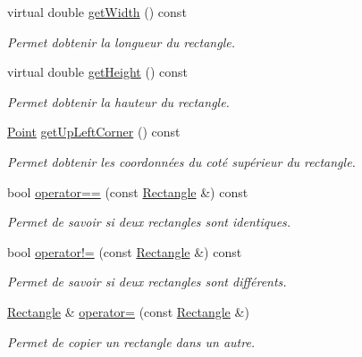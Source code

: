 \begin{DoxyCompactItemize}
virtual double \hyperlink{classRectangle_a1b97d538cc1acefa6b09aae2160e7921}{get\+Width} () const 
\begin{DoxyCompactList}\small\item\em Permet d\textquotesingle{}obtenir la longueur du rectangle. \end{DoxyCompactList}\item 
virtual double \hyperlink{classRectangle_aaad99f5dd2be859eef0eb3482cb55c13}{get\+Height} () const 
\begin{DoxyCompactList}\small\item\em Permet d\textquotesingle{}obtenir la hauteur du rectangle. \end{DoxyCompactList}\item 
\hyperlink{classPoint}{Point} \hyperlink{classRectangle_af54d3160a6d8d6c432b547207d997052}{get\+Up\+Left\+Corner} () const 
\begin{DoxyCompactList}\small\item\em Permet d\textquotesingle{}obtenir les coordonnées du coté supérieur du rectangle. \end{DoxyCompactList}\item 
bool \hyperlink{classRectangle_a140aa8d43ff12d36f3891dea9f439638}{operator==} (const \hyperlink{classRectangle}{Rectangle} \&) const 
\begin{DoxyCompactList}\small\item\em Permet de savoir si deux rectangles sont identiques. \end{DoxyCompactList}\item 
bool \hyperlink{classRectangle_ac29d68cce7f438771cf2b0e72888457a}{operator!=} (const \hyperlink{classRectangle}{Rectangle} \&) const 
\begin{DoxyCompactList}\small\item\em Permet de savoir si deux rectangles sont différents. \end{DoxyCompactList}\item 
\hyperlink{classRectangle}{Rectangle} \& \hyperlink{classRectangle_a64aa28fe918b233e6241a7841465b093}{operator=} (const \hyperlink{classRectangle}{Rectangle} \&)
\begin{DoxyCompactList}\small\item\em Permet de copier un rectangle dans un autre. \end{DoxyCompactList}\end{DoxyCompactItemize}
